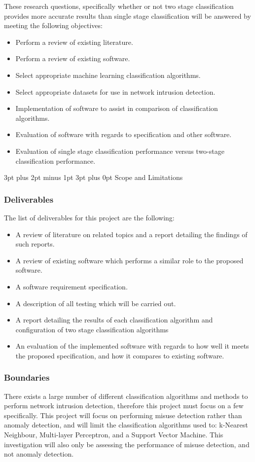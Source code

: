 \documentclass[12pt,a4paper]{article}
\makeatletter
\renewcommand\subsection{\@startsection {subsection}{1}{2mm} %
      {3pt plus 2pt minus 1pt} %
      {3pt plus 0pt} %
      {\normalfont\bfseries}}
\makeatother
\begin{document}
	These research questions, specifically whether or not two stage classification provides more accurate results than single stage classification will be answered by meeting the following objectives:
\begin{itemize}
\item{Perform a review of existing literature.}
\item{Perform a review of existing software.}
\item{Select appropriate machine learning classification algorithms.}
\item{Select appropriate datasets for use in network intrusion detection.}
\item{Implementation of software to assist in comparison of classification algorithms.}
\item{Evaluation of software with regards to specification and other software.}
\item{Evaluation of single stage classification performance versus two-stage classification performance.}
\end{itemize}

\subsection{Scope and Limitations}
	\subsubsection{Deliverables}
	The list of deliverables for this project are the following:
	\begin{itemize}
	\item{A review of literature on related topics and a report detailing the findings of such reports.}
	\item{A review of existing software which performs a similar role to the proposed software.}
	\item{A software requirement specification.}
	\item{A description of all testing which will be carried out.}
	\item{A report detailing the results of each classification algorithm and configuration of two stage classification algorithms}
	\item{An evaluation of the implemented software with regards to how well it meets the proposed specification, and how it compares to existing software.}
	\end{itemize}
	\subsubsection{Boundaries}
	There exists a large number of different classification algorithms and methods to perform network intrusion detection, therefore this project must focus on a few specifically. This project will focus on performing misuse detection rather than anomaly detection, and will limit the classification algorithms used to: k-Nearest Neighbour, Multi-layer Perceptron, and a Support Vector Machine. This investigation will also only be assessing the performance of misuse detection, and not anomaly detection.
\end{document}
